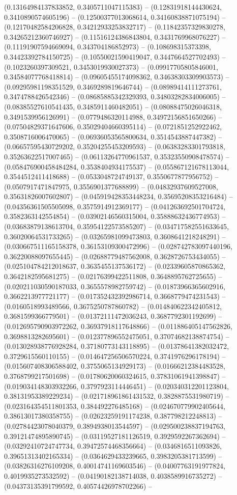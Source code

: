 (0.13164984137833852, 0.3405711047115383) -- (0.12831918144430624, 0.3410890574605196) -- (0.12500377013068614, 0.34160838871075194) -- (0.12170482584206828, 0.34212933253832717) -- (0.11842357329830278, 0.34265212360746927) -- (0.11516124386843804, 0.3431769968076227) -- (0.11191907594669094, 0.343704186852973) -- (0.108698315373398, 0.34423392784150725) -- (0.10550021590419047, 0.3447664527702493) -- (0.1023260397309521, 0.3453019930027373) -- (0.09917705805846001, 0.34584077768418814) -- (0.09605455174098362, 0.34638303309903573) -- (0.09295981198351529, 0.3469289819646744) -- (0.08989414111273761, 0.3474788426542346) -- (0.08685885342329393, 0.34803282834006005) -- (0.08385527610541435, 0.3485911460482051) -- (0.08088475026046318, 0.3491539956126991) -- (0.0779486320114988, 0.34972156851650266) -- (0.07504829371647606, 0.35029404660395114) -- (0.0721851252922462, 0.3508716006470065) -- (0.06936053565800634, 0.3514543887447382) -- (0.06657595430729202, 0.35204255453209593) -- (0.06383283301793818, 0.35263622517007465) -- (0.06113264770961537, 0.35323550908478574) -- (0.058476900458484284, 0.3538404934175537) -- (0.055867121678113044, 0.3544512411418688) -- (0.0533048724749137, 0.3550677877956752) -- (0.0507917471847975, 0.3556901377688899) -- (0.04832937609527008, 0.35631826007602807) -- (0.045919428353448234, 0.35695208353216484) -- (0.04356361505505098, 0.3575914912369177) -- (0.041263692501704724, 0.3582363142554854) -- (0.03902146560315004, 0.35888632436774953) -- (0.03683879138613704, 0.35954122573585207) -- (0.034717582551633645, 0.36020064531733265) -- (0.03265981099473803, 0.3608641218248291) -- (0.030667511165158378, 0.36153109300472996) -- (0.028742783097440196, 0.36220088097655445) -- (0.02688779487562008, 0.3628726753434055) -- (0.025104784212018637, 0.3635455137536172) -- (0.02339605870865362, 0.3642182595681275) -- (0.02176399422511808, 0.3648895762725655) -- (0.020211030590187033, 0.3655578982759742) -- (0.01873966365602916, 0.3662213977721177) -- (0.017352432392986714, 0.3668779474231543) -- (0.0160518993489566, 0.3675250787860782) -- (0.014840622342405812, 0.3681599366779501) -- (0.01372111472036243, 0.3687792301192699) -- (0.012695790903972262, 0.36937918117648866) -- (0.011886405147562826, 0.3698813282695601) -- (0.012377896552475051, 0.37074682138874754) -- (0.013028938776928284, 0.37180773143118895) -- (0.01378641382032472, 0.3729615560110155) -- (0.014647256506570224, 0.3741976296178194) -- (0.015607408306588402, 0.3755065134929173) -- (0.01666212384483528, 0.3768799217501698) -- (0.01780620060324615, 0.37831061941398847) -- (0.019034148303932266, 0.3797923114446451) -- (0.020340312201123804, 0.38131953389229234) -- (0.021718961861431532, 0.3828875531980719) -- (0.023164354511801353, 0.384492276485168) -- (0.024670779902405644, 0.38613017380358755) -- (0.02623259191174238, 0.387798212248813) -- (0.02784423078040379, 0.3894938013544597) -- (0.029500238837194763, 0.39121474895890745) -- (0.03119527181126519, 0.3929592267362694) -- (0.03292410724747734, 0.39472574468356664) -- (0.0346816511093826, 0.39651313402165334) -- (0.0364629433239665, 0.3983205381713599) -- (0.03826316276109208, 0.40014741169603546) -- (0.04007763191977824, 0.4019935273532592) -- (0.04190182138714038, 0.4038589916735272) -- (0.04373135391799592, 0.40574426978702266) -- 